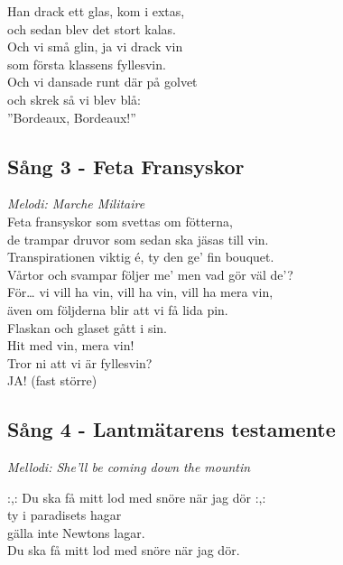 \documentclass[a5paper]{article}
\begin{document}
		\noindent 
		Han drack ett glas, kom i extas, \\
		och sedan blev det stort kalas. \\
		Och vi små glin, ja vi drack vin \\
		som första klassens fyllesvin. \\
		Och vi dansade runt där på golvet \\
		och skrek så vi blev blå:\\
		”Bordeaux, Bordeaux!” \\

	\subsection{Sång 3 - Feta Fransyskor}
		\textit{Melodi: Marche Militaire} \\
		
		\noindent
		Feta fransyskor som svettas om fötterna, \\
		de trampar druvor som sedan ska jäsas till vin. \\
		Transpirationen viktig é, ty den ge’ fin bouquet. \\
		Vårtor och svampar följer me’ men vad gör väl de’? \\
		
		\noindent
		För… vi vill ha vin, vill ha vin, vill ha mera vin, \\
		även om följderna blir att vi få lida pin. \\
		Flaskan och glaset gått i sin. \\
		Hit med vin, mera vin! \\
		Tror ni att vi är fyllesvin? \\
		JA! (fast större) \\
				
		\newpage
		
		
\subsection{Sång 4 - Lantmätarens testamente}
\textit{Mellodi: She'll be coming down the mountin} \\

\noindent

\noindent
:,: Du ska få mitt lod med snöre när jag dör :,: \\
ty i paradisets hagar \\
gälla inte Newtons lagar.\\
Du ska få mitt lod med snöre när jag dör. \\
\end{document}
